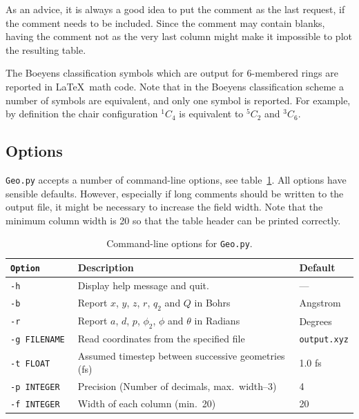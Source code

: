 \documentclass[a4paper,11pt,DIV=15,openany,twoside=false]{scrbook}
\newcommand{\ttt}[1]{\texttt{#1}}
\begin{document}
As an advice, it is always a good idea to put the comment as the last request, if the comment needs to be included. Since the comment may contain blanks, having the comment not as the very last column might make it impossible to plot the resulting table.

The Boeyens classification symbols which are output for 6-membered rings are reported in \LaTeX\ math code. Note that in the Boeyens classification scheme a number of symbols are equivalent, and only one symbol is reported. For example, by definition the chair configuration $^1C_4$ is equivalent to $^5C_2$ and $^3C_6$.

\subsection{Options}

\ttt{Geo.py} accepts a number of command-line options, see table~\ref{tab:Geo_options}. All options have sensible defaults. However, especially if long comments should be written to the output file, it might be necessary to increase the field width. Note that the minimum column width is 20 so that the table header can be printed correctly.

\begin{table}[h]
  \centering
  \caption{Command-line options for \ttt{Geo.py}. }
  \label{tab:Geo_options}
  \begin{tabular}{>{\tt}lll}
    \toprule
    \rmfamily Option         &Description    &Default\\
    \midrule
    -h          &Display help message and quit.         &---       \\
    -b          &Report $x$, $y$, $z$, $r$, $q_2$ and $Q$ in Bohrs       &Angstrom\\
    -r          &Report $a$, $d$, $p$, $\phi_2$, $\phi$ and $\theta$ in Radians         &Degrees\\
    -g FILENAME &Read coordinates from the specified file       &\ttt{output.xyz}\\
    -t FLOAT    &Assumed timestep between successive geometries (fs)    &1.0 fs\\
    -p INTEGER  &Precision (Number of decimals, max.~width--3)         &4\\
    -f INTEGER  &Width of each column (min.~20)                   &20\\
    \bottomrule
  \end{tabular}
\end{table}
\end{document}
